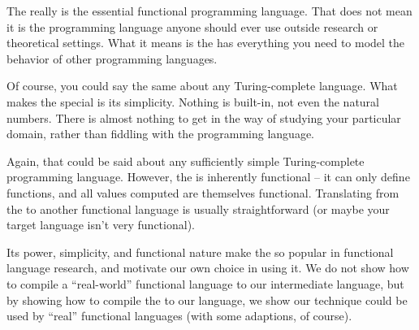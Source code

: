 \documentclass[12pt]{report}
\begin{document}
The \lamA really is the essential functional programming language.  
That does not mean it is the programming language anyone
should ever use outside research or theoretical settings. What it
means is the \lamA has everything you need to model the behavior
of other programming languages. 

Of course, you could say the same about any Turing-complete
language. What makes the \lamA special is its simplicity. Nothing is
built-in, not even the natural numbers. There is almost nothing to get
in the way of studying your particular domain, rather than fiddling
with the programming language.

Again, that could be said about any sufficiently simple
Turing-complete programming language. However, the \lamA is inherently
functional -- it can only define functions, and all values computed
are themselves functional. Translating from the \lamA to
another functional language is usually straightforward (or maybe your
target language isn't very functional). 

Its power, simplicity, and functional nature make the \lamA so popular
in functional language research, and motivate our own choice in using
it. We do not show how to compile a ``real-world'' functional language
to our intermediate language, but by showing how to compile the 
\lamA to our language, we show our technique could be used by ``real'' 
functional languages (with some adaptions, of course).





\end{document}
